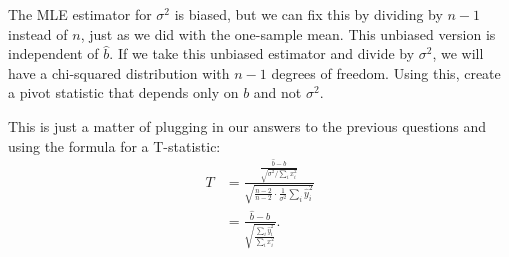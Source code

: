
The MLE estimator for $\sigma^2$ is biased, but we can fix this by dividing by
$n-1$ instead of $n$, just as we did with the one-sample mean. This unbiased
version is independent of $\widehat{b}$. If we take this unbiased estimator and
divide by $\sigma^2$, we will have a chi-squared distribution with $n-1$ degrees
of freedom. Using this, create a pivot statistic that depends only on $b$ and not
$\sigma^2$.


This is just a matter of plugging in our answers to the previous questions and
using the formula for a T-statistic:
\begin{align*}
T &= \frac{\frac{\widehat{b} - b}{\sqrt{\sigma^2 / \sum_i x_i^2}}}{
  \sqrt{ \frac{n-2}{n-2} \cdot \frac{1}{\sigma^2} \sum_i \widehat{y}_i^2 }
} \\
&=
\frac{\widehat{b} - b}{\sqrt{\frac{\sum_i \widehat{y}_i^2}{\sum_i x_i^2}}}.
\end{align*}



